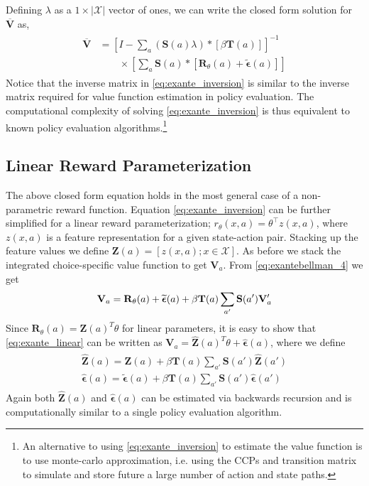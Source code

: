 \documentclass{article}
\renewcommand{\vec}[1]{\mbox{\bm{$#1$}}}
\begin{document}
Defining $\lambda$ as a $1\times|\mathcal{X}|$ vector of ones, we can write the closed form solution for $\overline{\mathbf{V}}$ as,
\begin{align} \label{eq:exante_inversion}
\begin{split}
\overline{\mathbf{V}} &=\left[I-\sum_{a}(\mathbf{S}(a) \lambda) *\left[ \beta \mathbf{T}(a)  \right]\right]^{-1} \\
& \qquad \times \left[\sum_{a}\mathbf{S}(a) *\left[ \mathbf{R}_{\theta}(a)+\tilde{\bm{\epsilon}}(a)\right]\right]
\end{split}
\end{align}
Notice that the inverse matrix in \eqref{eq:exante_inversion} is similar to the inverse matrix required for value function estimation in policy evaluation. The computational complexity of solving \eqref{eq:exante_inversion} is thus equivalent to known policy evaluation algorithms.\footnote{An alternative to using \ref{eq:exante_inversion} to estimate the value function is to use monte-carlo approximation, i.e. using the CCPs and transition matrix to simulate and store future a large number of action and state paths.}

\subsection{Linear Reward Parameterization}

The above closed form equation holds in the most general case of a non-parametric reward function. Equation \eqref{eq:exante_inversion} can be further simplified for a linear reward parameterization; $r_{\theta}(x,a) = \theta^{\top} z(x,a)$, where $z(x, a)$ is a feature representation for a given state-action pair. Stacking up the feature values we define $\mathbf{Z}(a) = [z(x, a); x \in \mathcal{X}]$. As before we stack the integrated choice-specific value function to get $\mathbf{V}_a$. From \eqref{eq:exantebellman_4} we get
\begin{align} \label{eq:exante_linear}
    \begin{split}
    \mathbf{V}_a=\mathbf{R}_{\theta}(a)+\widetilde{\vec{\epsilon}}(a)+\beta \mathbf{T}(a) \sum_{a'}\mathbf{S}(a')\mathbf{V}_a'
    \end{split}
\end{align}
Since $\mathbf{R}_{\theta}(a) = \mathbf{Z}(a)^T\theta$ for linear parameters, it is easy to show that \eqref{eq:exante_linear} can be written as $\mathbf{V}_a = \hat{\mathbf{Z}}(a)^T\theta + \hat{\bm{\epsilon}}(a)$, where we define
\begin{align} \label{eq:choice_specific_Z_tilde}
\begin{split}
    \hat{\mathbf{Z}}(a) = \mathbf{Z}(a) + \beta\mathbf{T}(a)\sum_{a'}\mathbf{S}(a')\hat{\mathbf{Z}}(a') \\
    \hat{\bm{\epsilon}}(a) = \tilde{\bm{\epsilon}}(a) + \beta\mathbf{T}(a)\sum_{a'}\mathbf{S}(a')\hat{\bm{\epsilon}}(a')
\end{split}    
\end{align}
Again both $\hat{\mathbf{Z}}(a)$ and $\hat{\bm{\epsilon}}(a)$ can be estimated via backwards recursion and is computationally similar to a single policy evaluation algorithm.
\end{document}
